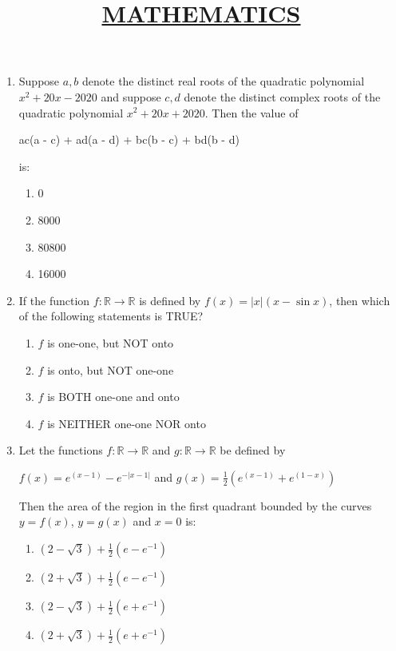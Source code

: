 \documentclass{article}
\title{\underline{\textbf{MATHEMATICS}}}
\date{}
\begin{document}
\maketitle
\begin{enumerate}
    
\item  Suppose $a, b$ denote the distinct real roots of the quadratic polynomial $x^2+20x-2020$ and suppose $c, d$ denote the distinct complex roots of the quadratic polynomial $x^2+20x+2020$. Then the value of

\begin{center}
     ac(a - c) + ad(a - d) + bc(b - c) + bd(b - d)
\end{center}

    is:
    
    \begin{enumerate}
        \item  0
        \item  8000
        \item  80800
        \item  16000
    \end{enumerate}

\item   If the function $f: \mathbb{R} \to \mathbb{R}$ is defined by $f(x)=|x|(x-\sin x)$, then which of the following statements is TRUE?

    \begin{enumerate}
        \item  $f$ is one-one, but NOT onto
        \item  $f$ is onto, but NOT one-one
        \item  $f$ is BOTH one-one and onto
        \item  $f$ is NEITHER one-one NOR onto
    \end{enumerate}

\item   Let the functions $f: \mathbb{R} \to \mathbb{R}$ and $g: \mathbb{R} \to \mathbb{R}$ be defined by 

$f(x) = e^{(x - 1)} - e^{- |x - 1|}$ and $ g(x) = \frac{1}{2} \left(e^{(x - 1)} + e^{(1 - x)}\right)$

    Then the area of the region in the first quadrant bounded by the curves $y = f(x)$, $y = g(x)$ and $x = 0$ is:

    \begin{enumerate}
        \item  $(2 - \sqrt{3}) + \frac{1}{2} (e - e^{-1})$
        \item  $(2 + \sqrt{3}) + \frac{1}{2} (e - e^{-1})$
        \item  $(2 - \sqrt{3}) + \frac{1}{2} (e + e^{-1})$
        \item  $(2 + \sqrt{3}) + \frac{1}{2} (e + e^{-1})$
    \end{enumerate}


\end{enumerate}
\end{document}
